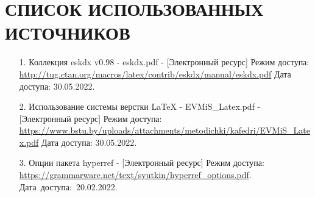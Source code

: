 \documentclass[
    12pt, %
    a4paper, %
    simple, %
    floatsection %
]{eskdtext}
\begin{document}
\newpage
{}
\section*{СПИСОК ИСПОЛЬЗОВАННЫХ ИСТОЧНИКОВ}
\begin{enumerate}
    \item[1.] Коллекция eskdx v0.98 - eskdx.pdf
    - [Электронный ресурс]
    Режим доступа: \url{http://tug.ctan.org/macros/latex/contrib/eskdx/manual/eskdx.pdf}
    Дата доступа: 30.05.2022.

    \item[2.] Использование системы верстки LaTeX - EVMiS\_Latex.pdf
    - [Электронный ресурс]
    Режим доступа: \url{https://www.bstu.by/uploads/attachments/metodichki/kafedri/EVMiS_Latex.pdf}
    Дата доступа: 30.05.2022.

    \item[3.] Опции пакета hyperref
    - [Электронный ресурс]
    Режим доступа: \url{https://grammarware.net/text/syutkin/hyperref_options.pdf}.
    Дата~доступа:~20.02.2022.
\end{enumerate}


\newpage
\end{document}
